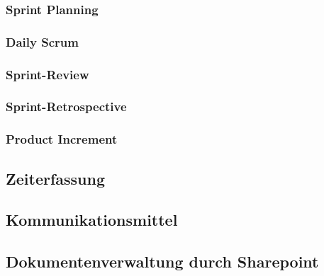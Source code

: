 \subsubsection{Sprint Planning}


\subsubsection {Daily Scrum}

\subsubsection{Sprint-Review}

\subsubsection{Sprint-Retrospective}

\subsubsection {Product Increment}

\subsection{Zeiterfassung}
\subsection{Kommunikationsmittel}
\subsection{Dokumentenverwaltung durch Sharepoint}
